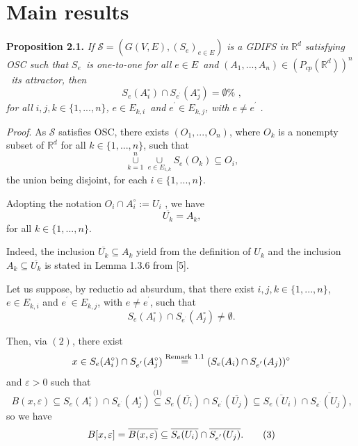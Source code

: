 \documentclass[a4paper,12pt,reqno]{amsart}
\numberwithin{equation}{section}
\theoremstyle{definition}
\theoremstyle{remark}
\numberwithin{equation}{section}
\begin{document}
	\section{Main results}

  
\textbf{Proposition 2.1.} \textit{If} $\mathcal{S}=(G(V,E),(S_{e})_{e\in E})$
\textit{is a GDIFS in} $\mathbb{R}^{d}$ \textit{satisfying OSC such that }$%
S_{e}$\textit{\ is one-to-one for all }$e\in E$\textit{\ and }$%
(A_{1},...,A_{n})\in (P_{cp}(\mathbb{R}^{d}))^{n}$\textit{\ its attractor,
then}%
\begin{equation*}
S_{e}(A_{i}^{\circ })\cap S_{e^{^{\prime }}}(A_{j}^{\circ })=\emptyset \text{%
,}
\end{equation*}%
\textit{for all }$i,j,k\in \{1,...,n\}$\textit{, }$e\in E_{k,i}$\textit{\
and }$e^{^{\prime }}\in E_{k,j}$\textit{, with }$e\neq e^{^{\prime }}$%
\textit{.}

\textit{Proof}. As $\mathcal{S}$ satisfies OSC, there exists $%
(O_{1},...,O_{n})$, where $O_{k}$ is a nonempty subset of $\mathbb{R}^{d}$
for all $k\in \{1,...,n\}$, such that 
\begin{equation*}
\underset{k=1}{\overset{n}{\cup }}\underset{e\in E_{i,k}}{\cup }%
S_{e}(O_{k})\subseteq O_{i}\text{,}
\end{equation*}%
the union being disjoint, for each $i\in \{1,...,n\}$.

Adopting the notation $O_{i}\cap A_{i}^{\circ }{:=}U_{i}$%
, we have%
\begin{equation}
\overline{U_{k}}=A_{k}\text{,}  \tag{1}
\end{equation}%
for all $k\in \{1,...,n\}$.

Indeed, the inclusion $\overline{U_{k}}\subseteq A_{k}$ yield from the
definition of $U_{k}$ and the inclusion $A_{k}\subseteq \overline{U_{k}}$ is
stated in Lemma 1.3.6 from [5].

Let us suppose, by reductio ad absurdum, that there exist $i,j,k\in
\{1,...,n\}$, $e\in E_{k,i}$ and $e^{^{\prime }}\in E_{k,j}$, with $e\neq
e^{^{\prime }}$, such that 
\begin{equation}
S_{e}(A_{i}^{\circ })\cap S_{e^{^{\prime }}}(A_{j}^{\circ })\neq \emptyset 
\text{.}  \tag{2}
\end{equation}

Then, via $(2)$, there exist 
\begin{equation*}
x\in S_{e}(A_{i}^{\circ })\cap S_{e^{^{\prime }}}(A_{j}^{\circ })\overset{%
\text{Remark 1.1}}{=}(S_{e}(A_{i})\cap S_{e^{^{\prime }}}(A_{j}))^{\circ }
\end{equation*}%
and $\varepsilon >0$ such that 
\begin{equation*}
B(x,\varepsilon )\subseteq S_{e}(A_{i}^{\circ })\cap S_{e^{^{\prime
}}}(A_{j}^{\circ })\overset{\text{(1)}}{\subseteq }S_{e}(\overline{U_{i}}%
)\cap S_{e^{^{\prime }}}(\overline{U_{j}})\subseteq \overline{S_{e}(U_{i})}%
\cap \overline{S_{e^{^{\prime }}}(U_{j})}\text{,}
\end{equation*}%
so we have 
\begin{equation}
B[x,\varepsilon ]=\overline{B(x,\varepsilon )}\subseteq \overline{%
S_{e}(U_{i})}\cap \overline{S_{e^{^{\prime }}}(U_{j})}\text{.}  \tag{3}
\end{equation}
\end{document}
